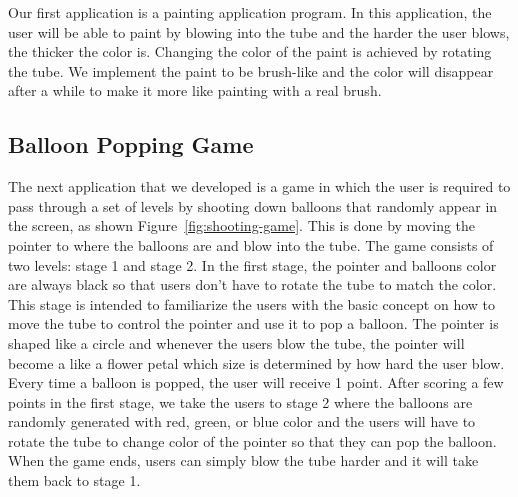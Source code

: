 
Our first application is a painting application program. In this application, the user will be able to paint by blowing into the tube and the harder the user blows, the thicker the color is. Changing the color of the paint is achieved by rotating the tube. We implement the paint to be brush-like and the color will disappear after a while to make it more like painting with a real brush.

\subsection{\textbf{Balloon Popping Game}}

The next application that we developed is a game in which the user is required to pass through a set of levels by shooting down balloons that randomly appear in the screen, as shown Figure~\ref{fig:shooting-game}. This is done by moving the pointer to where the balloons are and blow into the tube. The game consists of two levels: stage 1 and stage 2. In the first stage, the pointer and balloons color are always black so that users don’t have to rotate the tube to match the color. This stage is intended to familiarize the users with the basic concept on how to move the tube to control the pointer and use it to pop a balloon. The pointer is shaped like a circle and whenever the users blow the tube, the pointer will become a like a flower petal which size is determined by how hard the user blow. Every time a balloon is popped, the user will receive 1 point. After scoring a few points in the first stage, we take the users to stage 2 where the balloons are randomly generated with red, green, or blue color and the users will have to rotate the tube to change color of the pointer so that they can pop the balloon. When the game ends, users can simply blow the tube harder and it will take them back to stage 1.

